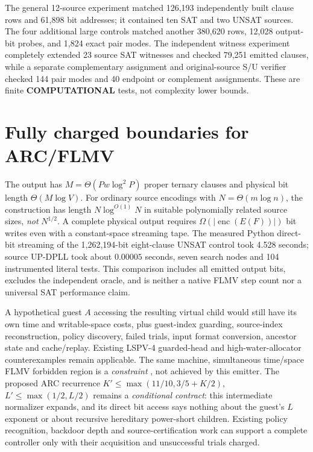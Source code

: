 \documentclass[11pt]{article}
\begin{document}
The general 12-source experiment matched 126,193 independently built
clause rows and 61,898 bit addresses; it contained ten SAT and two UNSAT
sources. The four additional large controls matched another 380,620 rows,
12,028 output-bit probes, and 1,824 exact pair modes. The independent
witness experiment completely extended 23 source SAT witnesses and checked
79,251 emitted clauses, while a separate complementary assignment and
original-source S/U verifier checked 144 pair modes and 40 endpoint or
complement assignments. These are finite \textbf{COMPUTATIONAL} tests, not
complexity lower bounds.

\section{Fully charged boundaries for ARC/FLMV}
The output has $M=\Theta(Pw\log^2P)$ proper ternary clauses and physical
bit length $\Theta(M\log V)$. For ordinary source encodings with
$N=\Theta(m\log n)$, the construction has length $N\log^{O(1)}N$ in
suitable polynomially related source sizes, \emph{not} $N^{1/2}$.
A complete physical output requires $\Omega(|\operatorname{enc}(E(F))|)$
bit writes even with a constant-space streaming tape. The measured
Python direct-bit streaming of the 1,262,194-bit eight-clause UNSAT
control took 4.528 seconds; source UP-DPLL took about $0.00005$ seconds,
seven search nodes and 104 instrumented literal tests. This comparison
includes all emitted output bits, excludes the independent oracle, and
is neither a native FLMV step count nor a universal SAT performance claim.

A hypothetical guest $A$ accessing the resulting virtual child would still
have its own time and writable-space costs, plus guest-index guarding,
source-index reconstruction, policy discovery, failed trials, input format
conversion, ancestor state and cache/replay. Existing LSPV-4 guarded-head
and high-water-allocator counterexamples remain applicable. The same
machine, simultaneous time/space FLMV forbidden region is a \emph{constraint}
\cite{flmv2005}, not achieved by this emitter. The proposed ARC recurrence
$K'\le\max(11/10,3/5+K/2)$,
$L'\le\max(1/2,L/2)$ remains a \emph{conditional contract}:
this intermediate normalizer expands, and its direct bit access says
nothing about the guest's $L$ exponent or about recursive hereditary
power-short children. Existing policy recognition, backdoor depth and
source-certification work \cite{dreier2024} can support a complete
controller only with their acquisition and unsuccessful trials charged.
\end{document}
